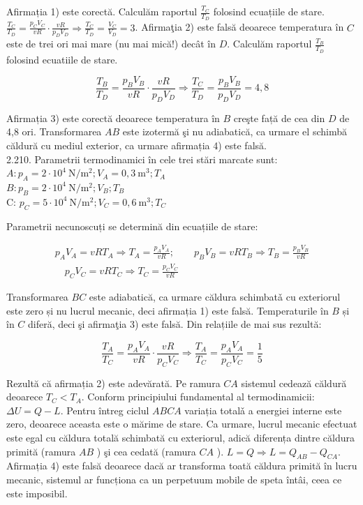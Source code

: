 \documentclass[10pt]{article}
\begin{document}
Afirmația 1) este corectă. Calculăm raportul $\frac{T_{C}}{T_{D}}$ folosind ecuațiile de stare.\\
$\frac{T_{C}}{T_{D}}=\frac{p_{C} V_{C}}{v R} \cdot \frac{v R}{p_{D} V_{D}} \Rightarrow \frac{T_{C}}{T_{D}}=\frac{V_{C}}{V_{D}}=3$. Afirmaţia 2) este falsă deoarece temperatura în $C$ este de trei ori mai mare (nu mai mică!) decât în $D$. Calculăm raportul $\frac{T_{B}}{T_{D}}$ folosind ecuatiile de stare.

$$
\frac{T_{B}}{T_{D}}=\frac{p_{B} V_{B}}{v R} \cdot \frac{v R}{p_{D} V_{D}} \Rightarrow \frac{T_{C}}{T_{D}}=\frac{p_{B} V_{B}}{p_{D} V_{D}}=4,8
$$

Afirmația 3) este corectă deoarece temperatura în $B$ creşte față de cea din $D$ de 4,8 ori. Transformarea $A B$ este izotermă şi nu adiabatică, ca urmare el schimbă căldură cu mediul exterior, ca urmare afirmația 4) este falsă.\\
2.210. Parametrii termodinamici în cele trei stări marcate sunt:\\
$A: p_{A}=2 \cdot 10^{4} \mathrm{~N} / \mathrm{m}^{2} ; V_{A}=0,3 \mathrm{~m}^{3} ; T_{A}$\\
$B: p_{B}=2 \cdot 10^{4} \mathrm{~N} / \mathrm{m}^{2} ; V_{B} ; T_{B}$\\
C: $p_{C}=5 \cdot 10^{4} \mathrm{~N} / \mathrm{m}^{2} ; V_{C}=0,6 \mathrm{~m}^{3} ; T_{C}$

Parametrii necunoscuți se determină din ecuațiile de stare:

$$
\begin{aligned}
p_{A} V_{A}=v R T_{A} \Rightarrow T_{A}=\frac{p_{A} V_{A}}{v R} ; \quad \quad p_{B} V_{B}=v R T_{B} \Rightarrow T_{B}=\frac{p_{B} V_{B}}{v R} \\
\quad p_{C} V_{C}=v R T_{C} \Rightarrow T_{C}=\frac{p_{C} V_{C}}{v R}
\end{aligned}
$$

Transformarea $B C$ este adiabatică, ca urmare căldura schimbatǎ cu exteriorul este zero și nu lucrul mecanic, deci afirmația 1) este falsă. Temperaturile în $B$ și în $C$ diferă, deci şi afirmaţia 3) este falsă. Din relațiile de mai sus rezultă:

$$
\frac{T_{A}}{T_{C}}=\frac{p_{A} V_{A}}{v R} \cdot \frac{v R}{p_{C} V_{C}} \Rightarrow \frac{T_{A}}{T_{C}}=\frac{p_{A} V_{A}}{p_{C} V_{C}}=\frac{1}{5}
$$

Rezultă că afirmația 2) este adevărată. Pe ramura $C A$ sistemul cedează căldură deoarece $T_{C}<T_{A}$. Conform principiului fundamental al termodinamicii: $\Delta U=Q-L$. Pentru întreg ciclul $A B C A$ variația totalǎ a energiei interne este zero, deoarece aceasta este o mărime de stare. Ca urmare, lucrul mecanic efectuat este egal cu căldura totală schimbată cu exteriorul, adică diferența dintre căldura primită (ramura $A B$ ) şi cea cedată (ramura $C A$ ). $L=Q \Rightarrow L=Q_{A B}-Q_{C A}$. Afirmația 4) este falsă deoarece dacă ar transforma toată căldura primită în lucru mecanic, sistemul ar funcționa ca un perpetuum mobile de speta întâi, ceea ce este imposibil.
\end{document}
